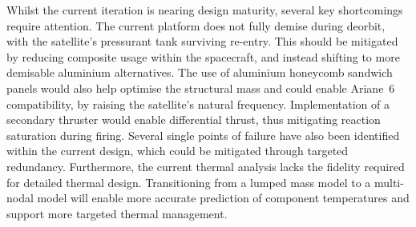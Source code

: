 \documentclass[a4paper, 11pt, conference]{IEEEtran}
\begin{document}
Whilst the current iteration is nearing design maturity, several key shortcomings require attention. The current platform does not fully demise during deorbit, with the satellite's pressurant tank surviving re-entry. This should be mitigated by reducing composite usage within the spacecraft, and instead shifting to more demisable aluminium alternatives. The use of aluminium honeycomb sandwich panels would also help optimise the structural mass and could enable Ariane~6 compatibility, by raising the satellite's natural frequency. Implementation of a secondary thruster would enable differential thrust, thus mitigating reaction saturation during firing. Several single points of failure have also been identified within the current design, which could be mitigated through targeted redundancy. Furthermore, the current thermal analysis lacks the fidelity required for detailed thermal design. Transitioning from a lumped mass model to a multi-nodal model will enable more accurate prediction of component temperatures and support more targeted thermal management. 
\FloatBarrier
\clearpage
\setcounter{topnumber}{\restoreFlowTopNumber}
\setcounter{bottomnumber}{\restoreFlowBottomNumber}
\setcounter{totalnumber}{\restoreFlowTotalNumber}
\endgroup
\end{document}
